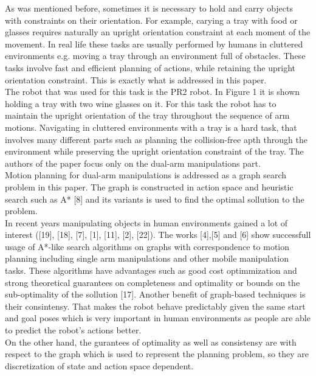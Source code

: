 \documentclass[11pt]{article}
\begin{document}
As was mentioned before, sometimes it is necessary to hold and carry objects with constraints on their orientation. For example, carying a tray with food or glasses requires naturally an upright orientation constraint at each moment of the movement. In real life these tasks are usually performed by humans in cluttered environments e.g. moving a tray through an environment full of obstacles. These tasks involve fast and efficient planning of actions, while retaining the upright orientation constraint. This is exactly what is addressed in this paper.\\
The robot that was used for this task is the PR2 robot. In Figure 1 it is shown holding a tray with two wine glasses on it. For this task the robot has to maintain the upright orientation of the tray throughout the sequence of arm motions. Navigating in cluttered environments with a tray is a hard task, that involves many different parts such as planning the collision-free apth through the environment while preserving the upright orientation constraint of the tray. The authors of the paper focus only on the dual-arm manipulations part.\\
Motion planning for dual-arm manipulations is addressed as a graph search problem in this paper. The graph is constructed in action space and heuristic search such as A* [8] and its variants is used to find the optimal sollution to the problem.\\
In recent years manipulating objects in human environments gained a lot of interest ([19], [18], [7], [1], [11], [2], [22]). The works [4],[5] and [6] show successfull usage of A*-like search algorithms on graphs with correspondence to motion planning including single arm manipulations and other mobile manipulation tasks. These algorithms have advantages such as good cost optimmization and strong theoretical guarantees on completeness and optimality or bounds on the sub-optimality of the sollution [17]. Another benefit of graph-based techniques is their consintensy. That makes the robot behave predictably given the same start and goal poses which is very important in human environments as people are able to predict the robot's actions better.\\
On the other hand, the gurantees of optimality as well as consistensy are with respect to the graph which is used to represent the planning problem, so they are discretization of state and action space dependent.\\
\end{document}
